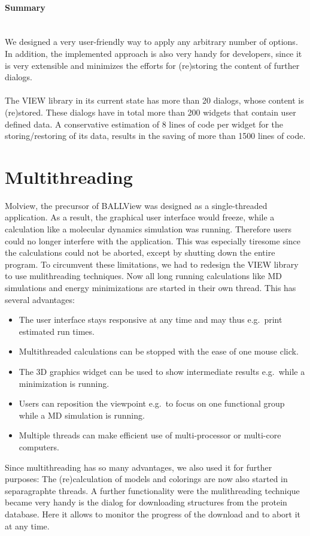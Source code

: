 \paragraph{Summary}
\hspace*{\fill}\\
We designed a very user-friendly way to apply any arbitrary number of options. 
In addition, the implemented approach is also very handy for developers, since it
is very extensible and minimizes the efforts for (re)storing the content of further dialogs. 
\\
\\
The VIEW library in its current state has more than 20 dialogs, whose content is (re)stored. 
These dialogs have in total more than 200 widgets that contain user defined data.
A conservative estimation of 8 lines of code per widget for the storing/restoring of its data, results in 
the saving of more than 1500 lines of code.
\section{Multithreading}\label{mthread}
Molview, the precursor of BALLView was designed as a single-threaded application. 
As a result, the graphical user interface would freeze, while a calculation like a 
molecular dynamics simulation was running.
Therefore users could no longer interfere with the application.
This was especially tiresome since the calculations could not be aborted, except by 
shutting down the entire program.
To circumvent these limitations, we had to redesign the VIEW library to use mulithreading 
techniques.
Now all long running calculations like MD simulations and energy minimizations are 
started in their own thread.
This has several advantages:
\begin{itemize}
\item The user interface stays responsive at any time and may thus e.g.\ print estimated run times.
\item Multithreaded calculations can be stopped with the ease of one mouse click.
\item The 3D graphics widget can be used to show intermediate results e.g.\ while a minimization is running.
\item Users can reposition the viewpoint e.g.\ to focus on one functional group while a MD simulation is running.
\item Multiple threads can make efficient use of multi-processor or multi-core computers.
\end{itemize}
Since multithreading has so many advantages, we also used it for further purposes:
The (re)calculation of models and colorings are now also started in separagraphte threads.
A further functionality were the mulithreading technique became very handy is the dialog for 
downloading structures from the protein database. 
Here it allows to monitor the progress of the download and to abort it at any time.

